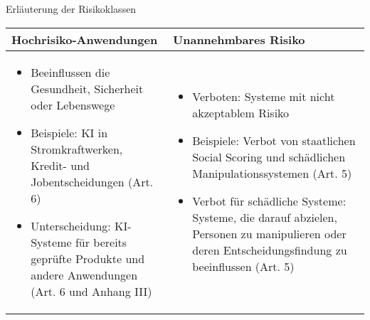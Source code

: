 \documentclass[aspectratio=169,16pt,xcolor=table]{beamer}
\begin{document}

\begin{frame}{Erläuterung der Risikoklassen}
  \begin{table}
      \centering
      \begin{tabular}{|p{6.5cm}|p{6.5cm}|}
          \hline
          \textbf{\footnotesize Hochrisiko-Anwendungen} & \textbf{\footnotesize Unannehmbares Risiko} \\
          \hline
          \begin{itemize}
              \item \scriptsize Beeinflussen die Gesundheit, Sicherheit oder Lebenswege 
              \item \scriptsize Beispiele: KI in Stromkraftwerken, Kredit- und Jobentscheidungen (Art. 6)
              \item \scriptsize Unterscheidung: KI-Systeme für bereits geprüfte Produkte und andere Anwendungen (Art. 6 und Anhang III)
          \end{itemize}
          &
          \begin{itemize}
              \item \scriptsize Verboten: Systeme mit nicht akzeptablem Risiko 
              \item \scriptsize Beispiele: Verbot von staatlichen Social Scoring und schädlichen Manipulationssystemen (Art. 5) 
              \item \scriptsize Verbot für schädliche Systeme: Systeme, die darauf abzielen, Personen zu manipulieren oder deren Entscheidungsfindung zu beeinflussen (Art. 5)
          \end{itemize} \\
          \hline
      \end{tabular}
  \end{table}
\end{frame}

\end{document}
